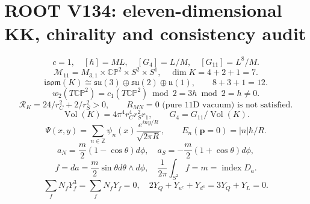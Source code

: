 \section*{ROOT V134: eleven-dimensional KK, chirality and consistency audit}
\[
  c=1,\quad [\hbar]=ML,\quad [G_4]=L/M,\quad [G_{11}]=L^8/M.
\]
\[
  \mathcal M_{11}=M_{3,1}\times \mathbb{CP}^{2}\times S^2\times S^1,
  \quad \dim K=4+2+1=7.
\]
\[
  \mathfrak{isom}(K)\cong\mathfrak{su}(3)\oplus
  \mathfrak{su}(2)\oplus\mathfrak u(1),\qquad 8+3+1=12.
\]
\[
  w_2(T\mathbb{CP}^{2})=c_1(T\mathbb{CP}^{2})\bmod2
 =3h\bmod2=h\ne0.
\]
\[
  \mathcal R_K=24/r_C^2+2/r_S^2>0,
  \qquad R_{MN}=0\text{ (pure 11D vacuum) is not satisfied}.
\]
\[
  \operatorname{Vol}(K)=4\pi^4r_C^4r_S^2r_1,
  \qquad G_4=G_{11}/\operatorname{Vol}(K).
\]
\[
  \Psi(x,y)=\sum_{n\in\mathbb Z}\psi_n(x)
  \frac{e^{iny/R}}{\sqrt{2\pi R}},\qquad
  E_n(\mathbf p=0)=|n|\hbar/R.
\]
\[
  a_N=\frac m2(1-\cos\theta)d\phi,\quad
  a_S=-\frac m2(1+\cos\theta)d\phi,
\]
\[
  f=da=\frac m2\sin\theta d\theta\wedge d\phi,\quad
  \frac1{2\pi}\int_{S^2}f=m=\operatorname{index}D_a.
\]
\[
  \sum_f N_f Y_f^3=\sum_fN_fY_f=0,\quad
  2Y_Q+Y_{u^c}+Y_{d^c}=3Y_Q+Y_L=0.
\]
